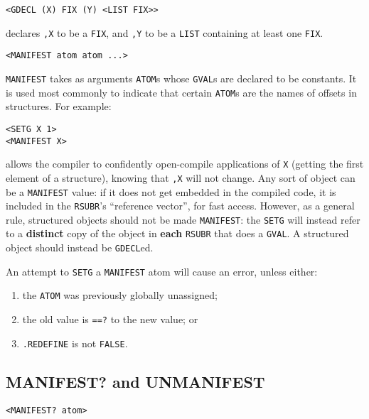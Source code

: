 \documentclass[a4paper]{scrbook}
\providecommand{\tightlist}{%
  \setlength{\itemsep}{0pt}\setlength{\parskip}{0pt}}
\begin{document}
\begin{verbatim}
<GDECL (X) FIX (Y) <LIST FIX>>
\end{verbatim}

declares \texttt{,X} to be a \texttt{FIX}, and \texttt{,Y} to be a \texttt{LIST} containing at least one \texttt{FIX}.

\begin{verbatim}
<MANIFEST atom atom ...>
\end{verbatim}

\texttt{MANIFEST} takes as arguments \texttt{ATOM}s whose \texttt{GVAL}s are declared to be constants. It is used most
commonly to indicate that certain \texttt{ATOM}s are the names of offsets in structures. For example:

\begin{verbatim}
<SETG X 1>
<MANIFEST X>
\end{verbatim}

allows the compiler to confidently open-compile applications of \texttt{X} (getting the first element of a structure),
knowing that \texttt{,X} will not change. Any sort of object can be a \texttt{MANIFEST} value: if it does not get embedded
in the compiled code, it is included in the \texttt{RSUBR}'s ``reference vector'', for fast access. However, as a general
rule, structured objects should not be made \texttt{MANIFEST}: the \texttt{SETG} will instead refer to a \textbf{distinct}
copy of the object in \textbf{each} \texttt{RSUBR} that does a \texttt{GVAL}. A structured object should instead be
\texttt{GDECL}ed.

An attempt to \texttt{SETG} a \texttt{MANIFEST} atom will cause an error, unless either:

\begin{enumerate}
\def\labelenumi{\arabic{enumi}.}
\tightlist
\item
  the \texttt{ATOM} was previously globally unassigned;
\item
  the old value is \texttt{==?} to the new value; or
\item
  \texttt{.REDEFINE} is not \texttt{FALSE}.
\end{enumerate}

\subsection{MANIFEST? and UNMANIFEST}\label{manifest-and-unmanifest}

\begin{verbatim}
<MANIFEST? atom>
\end{verbatim}
\end{document}
